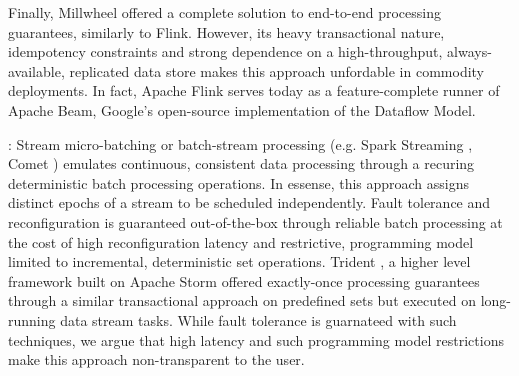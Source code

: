 Finally, Millwheel \cite{millwheel} offered a complete solution to end-to-end processing guarantees, similarly to Flink. However, its heavy transactional nature, idempotency constraints and strong dependence on a high-throughput, always-available, replicated data store \cite{chang2008bigtable,corbett2013spanner} makes this approach unfordable in commodity deployments. In fact, Apache Flink serves today as a feature-complete runner of Apache Beam, Google's open-source implementation of the Dataflow Model\cite{CUSTOM:web/Dataflow}.

: Stream micro-batching or batch-stream processing (e.g. Spark Streaming \cite{zaharia2012discretized}, Comet \cite{he2010comet}) emulates continuous, consistent data processing through a recuring deterministic batch processing operations. In essense, this approach assigns distinct epochs of a stream to be scheduled independently. Fault tolerance and reconfiguration is guaranteed out-of-the-box through reliable batch processing at the cost of high reconfiguration latency and restrictive, programming model limited to incremental, deterministic set operations. Trident \cite{CUSTOM:web/trident}, a higher level framework built on Apache Storm offered exactly-once processing guarantees through a similar transactional approach on predefined sets but executed on long-running data stream tasks. While fault tolerance is guarnateed with such techniques, we argue that high latency and such programming model restrictions make this approach non-transparent to the user. 
